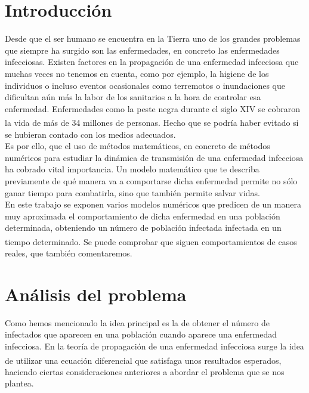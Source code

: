 \documentclass[a4paper,11pt]{article}
\numberwithin{equation}{section}
\begin{document}
\section{Introducción}

\indent Desde que el ser humano se encuentra en la Tierra uno de los grandes problemas que siempre ha surgido son las enfermedades, en concreto las enfermedades infecciosas. Existen factores en la propagación de una enfermedad infecciosa que muchas veces no tenemos en cuenta, como por ejemplo, la higiene de los individuos o incluso eventos ocasionales como terremotos o inundaciones que dificultan aún más la labor de los sanitarios a la hora de controlar esa enfermedad. Enfermedades como la peste negra durante el siglo XIV se cobraron la vida de más de 34 millones de personas{\tiny \bf \textsuperscript{\cite{wikiuno}}}. Hecho que se podría haber evitado si se hubieran contado con los medios adecuados. 
\\

\indent Es por ello, que el uso de métodos matemáticos, en concreto de métodos numéricos para estudiar la dinámica de transmisión de una enfermedad infecciosa ha cobrado vital importancia. Un modelo matemático que te describa previamente de qué manera va a comportarse dicha enfermedad permite no sólo ganar tiempo para combatirla, sino que también permite salvar vidas.  \\

\indent En este trabajo se exponen varios modelos numéricos que predicen de un manera muy aproximada el comportamiento de dicha enfermedad en una población determinada, obteniendo un número de población infectada infectada en un tiempo determinado{\tiny \bf \textsuperscript{\cite{blog}}}. Se puede comprobar que siguen comportamientos de casos reales, que también comentaremos.

\newpage
\section{Análisis del problema}
\indent Como hemos mencionado la idea principal es la de obtener el número de infectados que aparecen en una población cuando aparece una enfermedad infecciosa. En la teoría de propagación de una enfermedad infecciosa surge la idea de utilizar una ecuación diferencial{\tiny \bf \textsuperscript{\cite{hoja}}} que satisfaga unos resultados esperados, haciendo ciertas consideraciones anteriores a abordar el problema que se nos plantea. 
\end{document}
